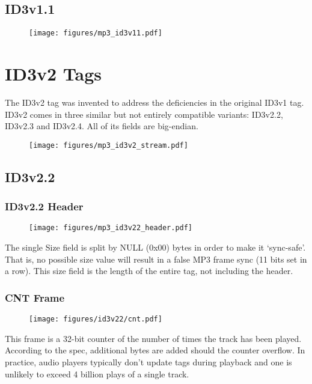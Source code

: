 \subsection{ID3v1.1}

\begin{figure}[h]
\texttt{[image: figures/mp3\_id3v11.pdf]}
\end{figure}

\section{ID3v2 Tags}

The ID3v2 tag was invented to address the deficiencies in the original
ID3v1 tag.
ID3v2 comes in three similar but not entirely compatible variants:
ID3v2.2, ID3v2.3 and ID3v2.4.
All of its fields are big-endian.

\begin{figure}[h]
\texttt{[image: figures/mp3\_id3v2\_stream.pdf]}
\end{figure}

\subsection{ID3v2.2}

\subsubsection{ID3v2.2 Header}

\begin{figure}[h]
\texttt{[image: figures/mp3\_id3v22\_header.pdf]}
\end{figure}
\par
\noindent
The single Size field is split by NULL (0x00) bytes in order to make
it `sync-safe'.
That is, no possible size value will result in a false
MP3 frame sync (11 bits set in a row).
This size field is the length of the entire tag, not including the header.

\subsubsection{CNT Frame}
\begin{figure}[h]
\texttt{[image: figures/id3v22/cnt.pdf]}
\end{figure}
This frame is a 32-bit counter of the number of times the track
has been played.
According to the spec, additional bytes are added should the counter
overflow.
In practice, audio players typically don't update tags during playback
and one is unlikely to exceed 4 billion plays of a single track.

